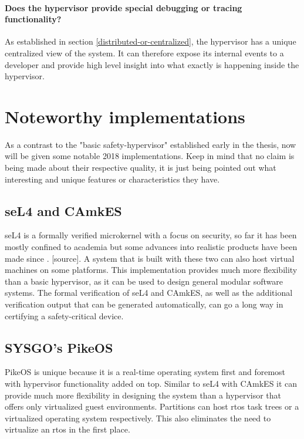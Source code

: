 \paragraph{Does the hypervisor provide special debugging or tracing functionality?}
As established in section \ref{distributed-or-centralized}, the hypervisor has a unique centralized view of the system. It can therefore expose its internal events to a developer and provide high level insight into what exactly is happening inside the hypervisor.


\section{Noteworthy implementations} \label{noteworthy-implementations}
As a contrast to the "basic safety-hypervisor" established early in the thesis, now will be given some notable 2018 implementations. Keep in mind that no claim is being made about their respective quality, it is just being pointed out what interesting and unique features or characteristics they have.
\subsection{seL4 and CAmkES} \label{seL4}
seL4 is a formally verified microkernel with a focus on security, so far it has been mostly confined to academia but some advances into realistic products have been made since \cite{fisher2012hacms}. [source]. A system that is built with these two can also host virtual machines on some platforms. This implementation provides much more flexibility than a basic hypervisor, as it can be used to design general modular software systems. The formal verification of seL4 and CAmkES, as well as the additional verification output that can be generated automatically, can go a long way in certifying a safety-critical device.
\subsection{SYSGO's PikeOS}
PikeOS is unique because it is a real-time operating system first and foremost with hypervisor functionality added on top. Similar to seL4 with CAmkES it can provide much more flexibility in designing the system than a hypervisor that offers only virtualized guest environments. Partitions can host \acrshort{rtos} task trees or a virtualized operating system respectively. This also eliminates the need to virtualize an \acrshort{rtos} in the first place.

